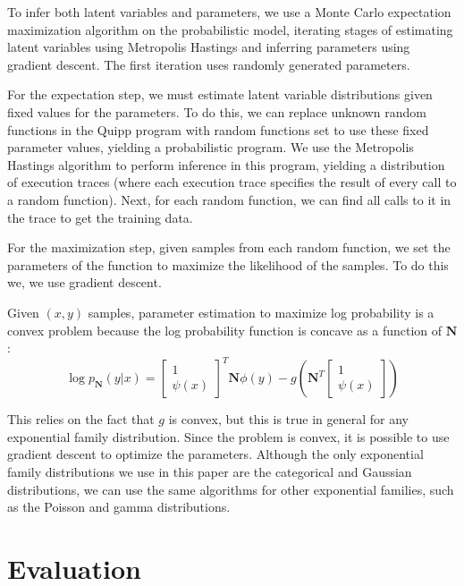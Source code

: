 \documentclass{article}
\begin{document}
    To infer both latent variables and parameters, we use a Monte Carlo
    expectation maximization algorithm \cite{mcem} on the probabilistic model, iterating stages of
    estimating latent variables using Metropolis Hastings and inferring
    parameters using gradient descent.  The first iteration uses randomly generated parameters.

    For the expectation step, we must estimate latent variable distributions given
    fixed values for the parameters.  To do this, we can replace unknown random functions in the Quipp program
    with random functions set to use these fixed parameter values, yielding a probabilistic program.
    We use the Metropolis Hastings algorithm to perform inference in this program,
    yielding a distribution of execution traces (where each execution trace specifies the result of every
    call to a random function).  Next, for each random function, we can find all calls
    to it in the trace to get the training data.

    For the maximization step, given samples from each random function, we set the
    parameters of the function to maximize the likelihood of the samples.  To do this we,
    we use gradient descent.

    Given $(x, y)$ samples, parameter estimation to maximize log probability is a convex
    problem because the log probability function is concave as a function of $\mathbf{N}$:
    $$\log p_{\mathbf{N}}(y | x) = \begin{bmatrix} 1 \\ \psi(x) \end{bmatrix} ^T \mathbf{N} \phi(y) - g\left(\mathbf{N}^T \begin{bmatrix} 1 \\ \psi(x) \end{bmatrix}\right)$$

    This relies on the fact that $g$ is convex, but this is true in general for any exponential family distribution.
    Since the problem is convex, it is possible to use gradient descent to optimize the parameters.  Although
    the only exponential family distributions we use in this paper are the categorical and Gaussian distributions,
    we can use the same algorithms for other exponential families, such as the Poisson and gamma distributions.

  \section{Evaluation}
\end{document}
